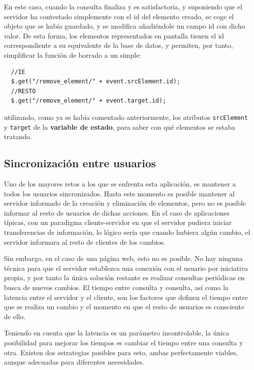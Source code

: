 En este caso, cuando la consulta finaliza y es satisfactoria, y suponiendo que el servidor ha contestado simplemente con el id del elemento creado, se coge el objeto que se había guardado, y se modifica añadiéndole un campo id con dicho valor. De esta forma, los elementos representados en pantalla tienen el id correspondiente a su equivalente de la base de datos, y permiten, por tanto, simplificar la función de borrado a un simple:

\begin{verbatim}
  //IE
  $.get("/remove_element/" + event.srcElement.id);
  //RESTO
  $.get("/remove_element/" + event.target.id);
\end{verbatim}

utilizando, como ya se había comentado anteriormente, los atributos \texttt{srcElement} y \texttt{target} de la \textbf{variable de estado}, para saber con qué elementos se estaba tratando.

\newpage
\subsection{Sincronización entre usuarios} %
\label{ssub:sincronizacion_entre_usuarios}

Uno de los mayores retos a los que se enfrenta esta aplicación, es mantener a todos los usuarios sincronizados. Hasta este momento es posible mantener al servidor informado de la creación y eliminación de elementos, pero no es posible informar al resto de usuarios de dichas acciones. En el caso de aplicaciones típicas, con un paradigma cliente-servidor en que el servidor pudiera iniciar transferencias de información, lo lógico sería que cuando hubiera algún cambio, el servidor informara al resto de clientes de los cambios.

Sin embargo, en el caso de una página web, esto no es posible. No hay ninguna técnica para que el servidor establezca una conexión con el usuario por iniciativa propia, y por tanto la única solución restante es realizar consultas periódicas en busca de nuevos cambios. El tiempo entre consulta y consulta, así como la latencia entre el servidor y el cliente, son los factores que definen el tiempo entre que se realiza un cambio y el momento en que el resto de usuarios es consciente de ello.

Teniendo en cuenta que la latencia es un parámetro incontrolable, la única posibilidad para mejorar los tiempos es cambiar el tiempo entre una consulta y otra. Existen dos estrategias posibles para esto, ambas perfectamente viables, aunque adecuadas para diferentes necesidades.

